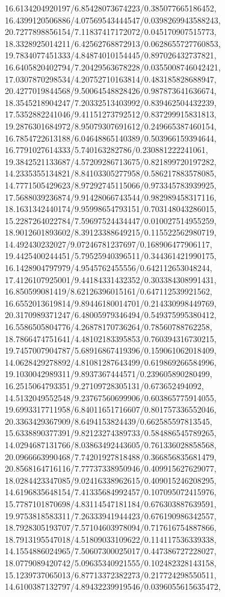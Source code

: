 {16.6134204920197/6.85428073674223/0.385077665186452,
16.4399120506886/4.07569543444547/0.0398269943588243,
20.7277898856154/7.11837417172072/0.045170907515773,
18.3328925014211/6.42562768872913/0.0628655727760853,
19.7834077451333/4.84874010154445/0.897026432737821,
16.6405820402794/7.20429563678228/0.0355008746042421,
17.0307870298534/4.20752710163814/0.483185828688947,
20.4277019844568/9.50064548828426/0.987873641636674,
18.3545218904247/7.20332513403992/0.839462504432239,
17.5352882241046/9.41151273792512/0.837299915831813,
19.2876301684972/8.95079307691612/0.249665387460154,
16.7854722613188/6.04648865140389/0.503966159394644,
16.7791027614333/5.740163282786/0.230881222241061,
19.3842521133687/4.57209286713675/0.821899720197282,
14.2335355134821/8.84103305277958/0.586217883578085,
14.7771505429623/8.97292745115066/0.973345783939925,
17.5688039236874/9.91428066743544/0.982989458317116,
18.1631342440174/9.95998654793151/0.703148043286015,
15.2287264022784/7.59697524434447/0.010027514955259,
18.9012601893602/8.39123388649215/0.115522562980719,
14.492430232027/9.07246781237697/0.168906477906117,
19.4425400244451/5.79525940396511/0.344361421990175,
16.1428904797979/4.9545762455556/0.642112653048244,
17.4126107925001/9.44184331432352/0.303384308991431,
16.850599081419/8.62126396015161/0.647112539921562,
16.6552013619814/9.89446180014701/0.214330998449769,
20.3170989371247/6.48005979346494/0.549375995380412,
16.5586505804776/4.26878170736264/0.78560788762258,
18.7866474751641/4.48102183395853/0.760394316730215,
19.7457007904787/5.68916867419396/0.159061062018409,
14.0628429278892/4.81081287643499/0.619869266584996,
19.1030042989311/9.8937367444571/0.239605890280499,
16.2515064793351/9.27109728305131/0.673652494092,
14.5132049552548/9.23767560699906/0.603865775914055,
19.6993317711958/6.84011651716607/0.801757336552046,
20.3363429367909/8.6494153824439/0.662585597813545,
15.6338890377391/9.82123274389733/0.584886545789265,
14.0294687131766/8.03863492443605/0.761336028858568,
20.0966663990468/7.74201927818488/0.366856835681479,
20.8568164716116/7.77737338950946/0.409915627629077,
18.0284423347085/9.02416338962615/0.409015246208295,
14.6196835648154/7.41335684992457/0.107095072415976,
15.7787101870698/4.83114547181184/0.676303887639591,
19.9753818583311/7.26333941944423/0.676190986342557,
18.7928305193707/7.57104603978094/0.717616754887866,
18.7913195547018/4.51809033109622/0.114117536339338,
14.1554886024965/7.50607300025017/0.447386727228027,
18.0779089420742/5.09635340921555/0.102482328143158,
15.1239737065013/6.87713372382273/0.217724298550511,
14.6100387132797/4.89432239919546/0.0396055615635472,
}
